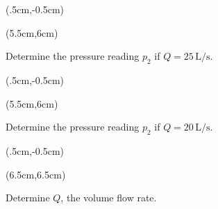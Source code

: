 \documentclass[9pt,xcolor={svgnames, x11names},professionalfonts, mathserif]{beamer}
\begin{document}

\begin{frame}
	\begin{textblock*}{6cm} (.5cm,-0.5cm)
	\end{textblock*}
	\begin{textblock*}{6cm} (5.5cm,6cm)
		\begin{myexam}[colframe=example, colbacktitle=example!80!white]{}{}
			
			Determine the pressure reading  $p_2$ if $Q=25\,\text{L/s}$.
			
		\end{myexam}
	\end{textblock*}
\end{frame}


\begin{frame}
	\begin{textblock*}{6cm} (.5cm,-0.5cm)
	\end{textblock*}
	\begin{textblock*}{6cm} (5.5cm,6cm)
		\begin{myexer}[colframe=example, colbacktitle=example!80!white]{}{}
			
			Determine the pressure reading  $p_2$ if $Q=20\,\text{L/s}$.
			
		\end{myexer}
	\end{textblock*}
\end{frame}




\begin{frame}
	\begin{textblock*}{6cm}(.5cm,-0.5cm)
	\end{textblock*}
	\begin{textblock*}{5cm}(6.5cm,6.5cm)
		\begin{myexam}[colframe=example, colbacktitle=example!80!white]{}{}
			\raggedright
			Determine $Q$, the volume flow rate.
		\end{myexam}
		
	\end{textblock*}
\end{frame}
\end{document}
